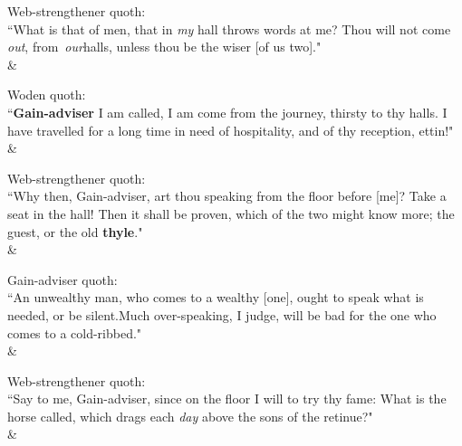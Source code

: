 \begin{Rightside}
\begin{astanza}%
\bv Web-strengthener quoth: \\ “What is that of men\footnotemark[10], that in \emph{my} hall throws words at me? Thou will not come \emph{out}, from \emph{our}\footnotemark[11] halls, unless thou be the wiser [of us two]." \\
\&\end{astanza}%

\begin{astanza}%
\bv Woden quoth: \\ “\textbf{Gain-adviser} I am called, I am come from the journey, thirsty to thy halls. I have travelled for a long time in need of hospitality, and of thy reception, ettin!" \\
\&\end{astanza}%

\begin{astanza}%
\bv Web-strengthener quoth: \\ “Why then, Gain-adviser, art thou speaking from the floor before [me]? Take a seat in the hall! Then it shall be proven, which of the two might know more; the guest, or the old \textbf{thyle}." \\
\&\end{astanza}%

\begin{astanza}%
\bv Gain-adviser quoth: \\ “An unwealthy man, who comes to a wealthy [one], ought to speak what is needed, or be silent.\footnotemark[14] Much over-speaking\footnotemark[15], I judge, will be bad for the one who comes to a cold-ribbed\footnotemark[16] [man]." \\
\&\end{astanza}%

\begin{astanza}%
\bv Web-strengthener quoth: \\ “Say to me, Gain-adviser, since on the floor I will to try thy fame: What is the horse called, which drags each \emph{day} above the sons of the retinue\footnotemark[20]?" \\
\&\end{astanza}%


\end{Rightside}
